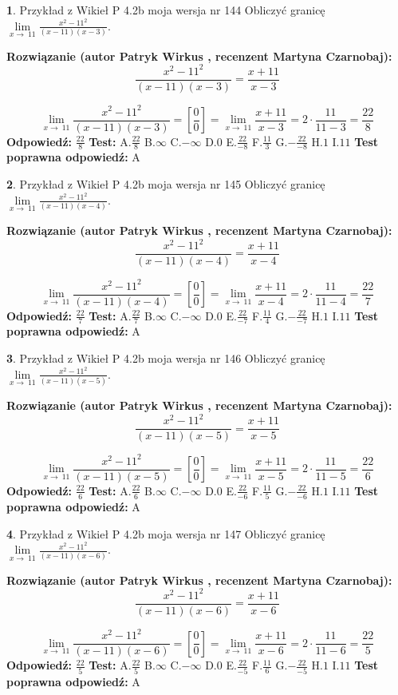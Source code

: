 \documentclass[12pt, a4paper]{article}
\theoremstyle{definition} %
\newtheorem{zad}{}
\newcommand{\zadStart}[1]{\begin{zad}#1\newline}
\newcommand{\zadStop}{\end{zad}}
\newcommand{\rozwStart}[2]{\noindent \textbf{Rozwiązanie (autor #1 , recenzent #2): }\newline}
\newcommand{\rozwStop}{\newline}
\newcommand{\odpStart}{\noindent \textbf{Odpowiedź:}\newline}
\newcommand{\odpStop}{\newline}
\newcommand{\testStart}{\noindent \textbf{Test:}\newline}
\newcommand{\testStop}{\newline}
\newcommand{\kluczStart}{\noindent \textbf{Test poprawna odpowiedź:}\newline}
\newcommand{\kluczStop}{\newline}
\begin{document}
\zadStart{Przykład z Wikieł P 4.2b moja wersja nr 144}
Obliczyć granicę $\lim\limits_{x\to\ 11}\frac{x^{2}-11^{2}}{(x-11)(x-3)}$.
\zadStop
\rozwStart{Patryk Wirkus}{Martyna Czarnobaj}
$$\frac{x^{2}-11^{2}}{(x-11)(x-3)}=\frac{x+11}{x-3}$$

$$\lim\limits_{x\to\ 11}\frac{x^{2}-11^{2}}{(x-11)(x-3)}=[\frac{0}{0}]=\lim\limits_{x\to\ 11}\frac{x+11}{x-3}=2 \cdot \frac{11}{11-3} = \frac{22}{8}$$
\rozwStop
\odpStart
$\frac{22}{8}$
\odpStop
\testStart
A.$\frac{22}{8}$
B.$\infty$
C.$-\infty$
D.$0$
E.$\frac{22}{-8}$
F.$\frac{11}{3}$
G.$-\frac{22}{-8}$
H.$1$
I.$11$
\testStop
\kluczStart
A
\kluczStop



\zadStart{Przykład z Wikieł P 4.2b moja wersja nr 145}
Obliczyć granicę $\lim\limits_{x\to\ 11}\frac{x^{2}-11^{2}}{(x-11)(x-4)}$.
\zadStop
\rozwStart{Patryk Wirkus}{Martyna Czarnobaj}
$$\frac{x^{2}-11^{2}}{(x-11)(x-4)}=\frac{x+11}{x-4}$$

$$\lim\limits_{x\to\ 11}\frac{x^{2}-11^{2}}{(x-11)(x-4)}=[\frac{0}{0}]=\lim\limits_{x\to\ 11}\frac{x+11}{x-4}=2 \cdot \frac{11}{11-4} = \frac{22}{7}$$
\rozwStop
\odpStart
$\frac{22}{7}$
\odpStop
\testStart
A.$\frac{22}{7}$
B.$\infty$
C.$-\infty$
D.$0$
E.$\frac{22}{-7}$
F.$\frac{11}{4}$
G.$-\frac{22}{-7}$
H.$1$
I.$11$
\testStop
\kluczStart
A
\kluczStop



\zadStart{Przykład z Wikieł P 4.2b moja wersja nr 146}
Obliczyć granicę $\lim\limits_{x\to\ 11}\frac{x^{2}-11^{2}}{(x-11)(x-5)}$.
\zadStop
\rozwStart{Patryk Wirkus}{Martyna Czarnobaj}
$$\frac{x^{2}-11^{2}}{(x-11)(x-5)}=\frac{x+11}{x-5}$$

$$\lim\limits_{x\to\ 11}\frac{x^{2}-11^{2}}{(x-11)(x-5)}=[\frac{0}{0}]=\lim\limits_{x\to\ 11}\frac{x+11}{x-5}=2 \cdot \frac{11}{11-5} = \frac{22}{6}$$
\rozwStop
\odpStart
$\frac{22}{6}$
\odpStop
\testStart
A.$\frac{22}{6}$
B.$\infty$
C.$-\infty$
D.$0$
E.$\frac{22}{-6}$
F.$\frac{11}{5}$
G.$-\frac{22}{-6}$
H.$1$
I.$11$
\testStop
\kluczStart
A
\kluczStop



\zadStart{Przykład z Wikieł P 4.2b moja wersja nr 147}
Obliczyć granicę $\lim\limits_{x\to\ 11}\frac{x^{2}-11^{2}}{(x-11)(x-6)}$.
\zadStop
\rozwStart{Patryk Wirkus}{Martyna Czarnobaj}
$$\frac{x^{2}-11^{2}}{(x-11)(x-6)}=\frac{x+11}{x-6}$$

$$\lim\limits_{x\to\ 11}\frac{x^{2}-11^{2}}{(x-11)(x-6)}=[\frac{0}{0}]=\lim\limits_{x\to\ 11}\frac{x+11}{x-6}=2 \cdot \frac{11}{11-6} = \frac{22}{5}$$
\rozwStop
\odpStart
$\frac{22}{5}$
\odpStop
\testStart
A.$\frac{22}{5}$
B.$\infty$
C.$-\infty$
D.$0$
E.$\frac{22}{-5}$
F.$\frac{11}{6}$
G.$-\frac{22}{-5}$
H.$1$
I.$11$
\testStop
\kluczStart
A
\kluczStop
\end{document}
